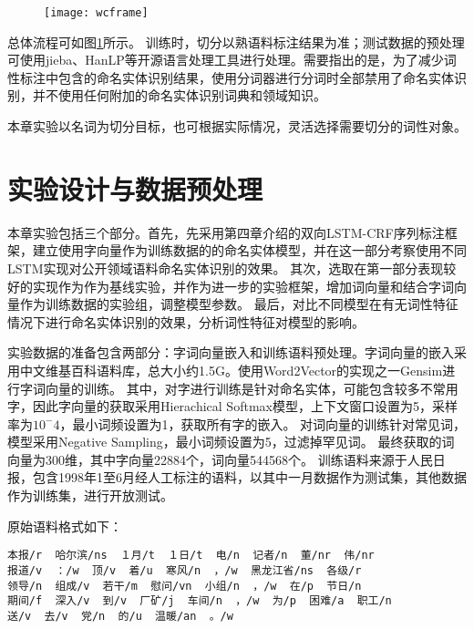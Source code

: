 \begin{figure}[H]
    \centering
    \texttt{[image: wcframe]}
    \label{fig:exp_frame}
\end{figure}

总体流程可如图\ref{fig:exp_frame}所示。
训练时，切分以熟语料标注结果为准；测试数据的预处理可使用jieba、HanLP\citep{hanlp}等开源语言处理工具进行处理。需要指出的是，为了减少词性标注中包含的命名实体识别结果，使用分词器进行分词时全部禁用了命名实体识别，并不使用任何附加的命名实体识别词典和领域知识。

本章实验以名词为切分目标，也可根据实际情况，灵活选择需要切分的词性对象。

\section{实验设计与数据预处理}
本章实验包括三个部分。首先，先采用第四章介绍的双向LSTM-CRF序列标注框架，建立使用字向量作为训练数据的的命名实体模型，并在这一部分考察使用不同LSTM实现对公开领域语料命名实体识别的效果。
其次，选取在第一部分表现较好的实现作为作为基线实验，并作为进一步的实验框架，增加词向量和结合字词向量作为训练数据的实验组，调整模型参数。
最后，对比不同模型在有无词性特征情况下进行命名实体识别的效果，分析词性特征对模型的影响。


实验数据的准备包含两部分：字词向量嵌入和训练语料预处理。字词向量的嵌入采用中文维基百科语料库，总大小约1.5G。使用Word2Vector的实现之一Gensim进行字词向量的训练。
其中，对字进行训练是针对命名实体，可能包含较多不常用字，因此字向量的获取采用Hierachical Softmax模型，上下文窗口设置为5，采样率为$10^-4$，最小词频设置为1，获取所有字的嵌入。
对词向量的训练针对常见词，模型采用Negative Sampling，最小词频设置为5，过滤掉罕见词。
最终获取的词向量为300维，其中字向量22884个，词向量544568个。
训练语料来源于人民日报，包含1998年1至6月经人工标注的语料，以其中一月数据作为测试集，其他数据作为训练集，进行开放测试。

原始语料格式如下：

\begin{verbatim}
本报/r  哈尔滨/ns  １月/t  １日/t  电/n  记者/n  董/nr  伟/nr
报道/v  ：/w  顶/v  着/u  寒风/n  ，/w  黑龙江省/ns  各级/r
领导/n  组成/v  若干/m  慰问/vn  小组/n  ，/w  在/p  节日/n
期间/f  深入/v  到/v  厂矿/j  车间/n  ，/w  为/p  困难/a  职工/n
送/v  去/v  党/n  的/u  温暖/an  。/w
\end{verbatim}

